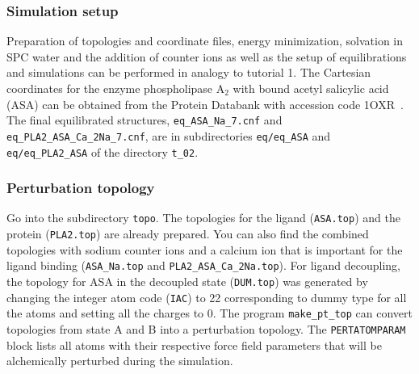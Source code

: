 \subsubsection{Simulation setup}
Preparation of topologies and coordinate files, energy minimization, solvation in SPC water and the addition of counter ions as well as the setup of equilibrations and simulations can be performed in analogy to tutorial 1. The Cartesian coordinates for the enzyme phospholipase A$_2$ with bound acetyl salicylic acid (ASA) can be obtained from the Protein Databank with accession code 1OXR~\cite{Singh2005}.
The final equilibrated structures, \texttt{eq\_ASA\_Na\_7.cnf} and \texttt{eq\_PLA2\_ASA\_Ca\_2Na\_7.cnf}, are in subdirectories \texttt{eq/eq\_ASA} and \texttt{eq/eq\_PLA2\_ASA} of the directory \texttt{t\_02}. 

\subsubsection{Perturbation topology}
Go into the subdirectory \texttt{topo}. The topologies for the ligand (\texttt{ASA.top}) and the protein (\texttt{PLA2.top}) are already prepared. You can also find the combined topologies with sodium counter ions and a calcium ion that is important for the ligand binding (\texttt{ASA\_Na.top} and \texttt{PLA2\_ASA\_Ca\_2Na.top}). For ligand decoupling, the topology for ASA in the decoupled state (\texttt{DUM.top}) was generated by changing the integer atom code (\texttt{IAC}) to 22 corresponding to dummy type for all the atoms and setting all the charges to 0. The program \texttt{make\_pt\_top} can convert topologies from state A and B into a perturbation topology. The \texttt{PERTATOMPARAM} block lists all atoms with their respective force field parameters that will be alchemically perturbed during the simulation. 

